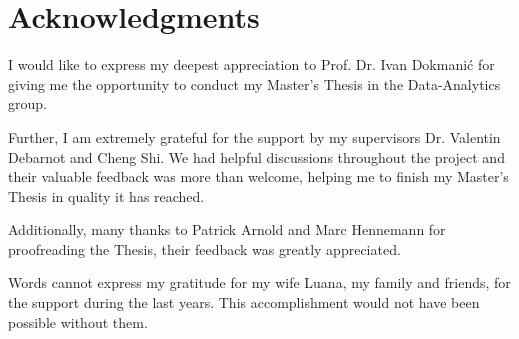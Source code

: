 \chapter{Acknowledgments}

I would like to express my deepest appreciation to Prof. Dr. Ivan Dokmanić
for giving me the opportunity to conduct my Master's Thesis in the 
Data-Analytics group.

\bigskip

Further, I am extremely grateful for the support by my supervisors
Dr. Valentin Debarnot and Cheng Shi. We had helpful discussions
throughout the project and their valuable feedback was more than welcome,
helping me to finish my Master's Thesis in quality it has reached.

\bigskip
Additionally, many thanks to Patrick Arnold and Marc Hennemann for 
proofreading the Thesis, their feedback was greatly appreciated.

\bigskip
Words cannot express my gratitude for my wife Luana, my family and friends,
for the support during the last years.
This accomplishment would not have been possible without them.